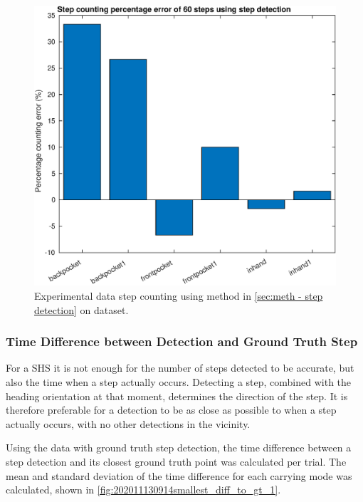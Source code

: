 \begin{figure}[H]
	\centering
	\includegraphics[width=0.7\linewidth]{images/20201127_1640_Step_counting_percentage_error_of_60_steps_using_step_detection}
	\setlength{\belowcaptionskip}{-20pt}
	\caption{Experimental data step counting using method in \cref{sec:meth - step detection} on \citet{Brajdic2013} dataset.}
	\label{fig:202009291013step_counting_error_of_60_steps}
\end{figure}

\subsubsection{Time Difference between Detection and Ground Truth Step}

For a \ac{SHS} it is not enough for the number of steps detected to be accurate, but also the time when a step actually occurs. Detecting a step, combined with the heading orientation at that moment, determines the direction of the step. It is therefore preferable for a detection to be as close as possible to when a step actually occurs, with no other detections in the vicinity. \par
Using the \citet{Salvi2018} data with ground truth step detection, the time difference between a step detection and its closest ground truth point was calculated per trial. The mean and standard deviation of the time difference for each carrying mode was calculated, shown in \cref{fig:202011130914smallest_diff_to_gt_1}. 

